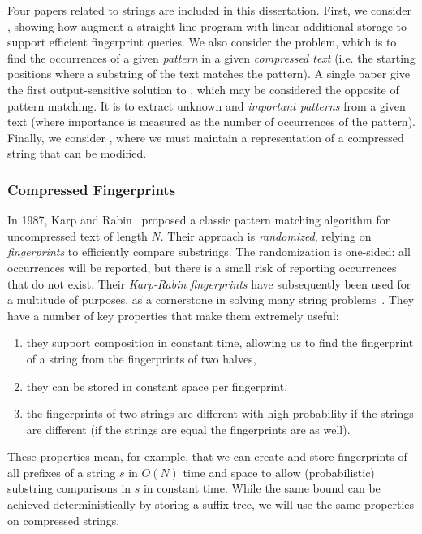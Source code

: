Four papers related to strings are included in this dissertation. 
First, we consider , showing how augment a straight line program with linear additional storage to support efficient fingerprint queries.
We also consider the  problem, which is to find the occurrences of a given \emph{pattern} in a given \emph{compressed text} (i.e. the starting positions where a substring of the text matches the pattern). 
A single paper give the first output-sensitive solution to , which may be considered the opposite of pattern matching. It is to extract unknown and \emph{important patterns} from a given text (where importance is measured as the number of occurrences of the pattern). 
Finally, we consider , where we must maintain a representation of a compressed string that can be modified.



\clearpage
\subsubsection{Compressed Fingerprints}
In 1987, Karp and Rabin~\cite{karp1987efficient} proposed a classic pattern matching algorithm for uncompressed text of length $N$. Their approach is \emph{randomized}, relying on \emph{fingerprints} to efficiently compare substrings. The randomization is one-sided: all occurrences will be reported, but there is a small risk of reporting occurrences that do not exist.
Their \emph{Karp-Rabin fingerprints} have subsequently been used for a multitude of purposes, as a cornerstone in solving many string problems~\cite{amir1992efficient, andoni2006efficient, cole2003faster, cormode2005substring, cormode2007string, farach1998string, gasieniec1996randomized, kalai2002efficient, porat2009exact}. 
They have a number of key properties that make them extremely useful:
\begin{enumerate}
    \item they support composition in constant time, allowing us to find the fingerprint of a string from the fingerprints of two halves,
    \item they can be stored in constant space per fingerprint,
    \item the fingerprints of two strings are different with high probability if the strings are different (if the strings are equal the fingerprints are as well).
\end{enumerate}
These properties mean, for example, that we can create and store fingerprints of all prefixes of a string $s$ in $O(N)$ time and space to allow (probabilistic) substring comparisons in $s$ in constant time. While the same bound can be achieved deterministically by storing a suffix tree, we will use the same properties on compressed strings.


